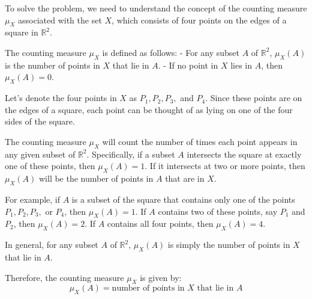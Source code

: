 To solve the problem, we need to understand the concept of the counting measure \(\mu_X\) associated with the set \(X\), which consists of four points on the edges of a square in \(\mathbb{R}^2\).

The counting measure \(\mu_X\) is defined as follows:
- For any subset \(A\) of \(\mathbb{R}^2\), \(\mu_X(A)\) is the number of points in \(X\) that lie in \(A\).
- If no point in \(X\) lies in \(A\), then \(\mu_X(A) = 0\).

Let's denote the four points in \(X\) as \(P_1, P_2, P_3,\) and \(P_4\). Since these points are on the edges of a square, each point can be thought of as lying on one of the four sides of the square.

The counting measure \(\mu_X\) will count the number of times each point appears in any given subset of \(\mathbb{R}^2\). Specifically, if a subset \(A\) intersects the square at exactly one of these points, then \(\mu_X(A) = 1\). If it intersects at two or more points, then \(\mu_X(A)\) will be the number of points in \(A\) that are in \(X\).

For example, if \(A\) is a subset of the square that contains only one of the points \(P_1, P_2, P_3,\) or \(P_4\), then \(\mu_X(A) = 1\). If \(A\) contains two of these points, say \(P_1\) and \(P_2\), then \(\mu_X(A) = 2\). If \(A\) contains all four points, then \(\mu_X(A) = 4\).

In general, for any subset \(A\) of \(\mathbb{R}^2\), \(\mu_X(A)\) is simply the number of points in \(X\) that lie in \(A\).

Therefore, the counting measure \(\mu_X\) is given by:
\[
\boxed{\mu_X(A) = \text{number of points in } X \text{ that lie in } A}
\]